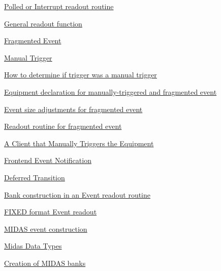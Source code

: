 \begin{TabularC}{2}
\begin{TabularC}{2}
\begin{DoxyItemize}
\begin{DoxyItemize}
\begin{DoxyItemize}
\begin{DoxyItemize}
\item \hyperlink{FE_eq_event_routines_FE_poll_or_interrupt_readout_routine}{Polled or Interrupt readout routine} 
\item \hyperlink{FE_eq_event_routines_FE_other_event}{General readout function} 
\item \hyperlink{FE_eq_event_routines_FE_fragmented_event}{Fragmented Event} 
\item \hyperlink{FE_eq_event_routines_FE_manual_trigger}{Manual Trigger} 
\begin{DoxyItemize}
\item \hyperlink{FE_eq_event_routines_FE_manual_trig_determine}{How to determine if trigger was a manual trigger} 
\end{DoxyItemize}
\item \hyperlink{FE_eq_event_routines_FE_tdmusr_equipment}{Equipment declaration for manually-\/triggered and fragmented event} 
\item \hyperlink{FE_eq_event_routines_FE_frag_max_event_size}{Event size adjustments for fragmented event} 
\item \hyperlink{FE_eq_event_routines_FE_frag_readout_code}{Readout routine for fragmented event} 
\item \hyperlink{FE_eq_event_routines_FE_backend_Manual_Trigger}{A Client that Manually Triggers the Equipment} 
\end{DoxyItemize}
\end{DoxyItemize}
\item \hyperlink{FE_event_notification}{Frontend Event Notification} 
\begin{DoxyItemize}
\item \hyperlink{FE_event_notification_FE_Deferred_Transition}{Deferred Transition} 
\end{DoxyItemize}
\item \hyperlink{FE_bank_construction}{Bank construction in an Event readout routine} 
\begin{DoxyItemize}
\item \hyperlink{FE_bank_construction_FE_FIXED_event_readout}{FIXED format Event readout} 
\item \hyperlink{FE_bank_construction_FE_MIDAS_event_construction}{MIDAS event construction} 
\begin{DoxyItemize}
\item \hyperlink{FE_bank_construction_FE_Midas_Data_Types}{Midas Data Types} 
\item \hyperlink{FE_bank_construction_FE_creation_Midas_banks}{Creation of MIDAS banks} 

\end{DoxyItemize}
\end{DoxyItemize}
\end{DoxyItemize}
\end{DoxyItemize}
\end{TabularC}
\end{TabularC}
